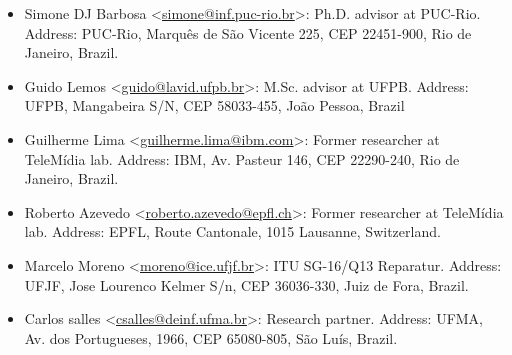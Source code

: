 \begin{itemize}[nosep]
  \item Simone DJ Barbosa <\href{mailto:simone@inf.puc-rio.br}{simone@inf.puc-rio.br}>: Ph.D. advisor at PUC-Rio. Address: PUC-Rio, Marquês de São Vicente 225, CEP 22451-900, Rio de Janeiro, Brazil.
  \item Guido Lemos <\href{mailto:guido@lavid.ufpb.br}{guido@lavid.ufpb.br}>: M.Sc. advisor at UFPB. Address: UFPB, Mangabeira S/N, CEP 58033-455, João Pessoa, Brazil
  \item Guilherme Lima <\href{mailto:guilherme.lima@ibm.com}{guilherme.lima@ibm.com}>: Former researcher at TeleMídia lab. Address: IBM, Av. Pasteur 146, CEP 22290-240, Rio de Janeiro, Brazil.
  \item Roberto Azevedo <\href{mailto:roberto.azevedo@epfl.ch}{roberto.azevedo@epfl.ch}>: Former researcher at TeleMídia lab. Address: EPFL, Route Cantonale, 1015 Lausanne, Switzerland.
  \item Marcelo Moreno <\href{mailto:moreno@ice.ufjf.br}{moreno@ice.ufjf.br}>: ITU SG-16/Q13 Reparatur. Address: UFJF, Jose Lourenco Kelmer S/n, CEP 36036-330, Juiz de Fora, Brazil.
  \item Carlos salles <\href{mailto:csalles@deinf.ufma.br}{csalles@deinf.ufma.br}>: Research partner. Address: UFMA, Av. dos Portugueses, 1966, CEP 65080-805, São Luís, Brazil.
\end{itemize}